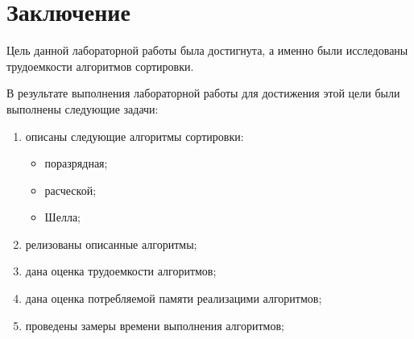 \chapter*{Заключение}

Цель данной лабораторной работы была достигнута, а именно были исследованы трудоемкости алгоритмов сортировки.

В результате выполнения лабораторной работы для достижения этой цели были выполнены следующие задачи:
\begin{enumerate}
    \item описаны следующие алгоритмы сортировки:
        \begin{itemize}
            \item поразрядная;
            \item расческой;
            \item Шелла;
        \end{itemize}
    \item релизованы описанные алгоритмы;
    \item дана оценка трудоемкости алгоритмов;
    \item дана оценка потребляемой памяти реализацими алгоритмов;
    \item проведены замеры времени выполнения алгоритмов;
\end{enumerate}

